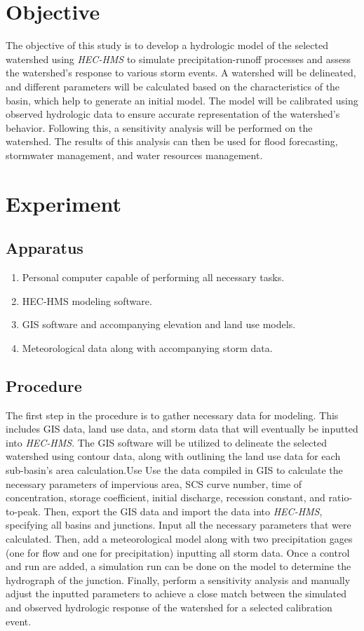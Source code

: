 \documentclass{article}
\begin{document}

\newpage
\doublespacing
\tableofcontents
\newpage
{}
\listoftables
{}
\listoffigures
\newpage
\section{Objective} 
The objective of this study is to develop a hydrologic model of the selected watershed using \emph{HEC-HMS} to simulate precipitation-runoff processes and assess the watershed's response to various storm events. A watershed will be delineated, and different parameters will be calculated based on the characteristics of the basin, which help to generate an initial model. The model will be calibrated using observed hydrologic data to ensure accurate representation of the watershed's behavior. Following this, a sensitivity analysis will be performed on the watershed. The results of this analysis can then be used for flood forecasting, stormwater management, and water resources management.
\newpage
\section{Experiment}
\subsection{Apparatus}
\begin{enumerate}
    \item Personal computer capable of performing all necessary tasks. 
    \item HEC-HMS modeling software. 
    \item GIS software and accompanying elevation and land use models.
    \item Meteorological data along with accompanying storm data.
\end{enumerate}
\subsection{Procedure}
\indent The first step in the procedure is to gather necessary data for modeling. This includes GIS data, land use data, and storm data that will eventually be inputted into \emph{HEC-HMS}. The GIS software will be utilized to delineate the selected watershed using contour data, along with outlining the land use data for each sub-basin's area calculation.Use Use the data compiled in GIS to calculate the necessary parameters of impervious area, SCS curve number, time of concentration, storage coefficient, initial discharge, recession constant, and ratio-to-peak. Then, export the GIS data and import the data into \emph{HEC-HMS}, specifying all basins and junctions. Input all the necessary parameters that were calculated. Then, add a meteorological model along with two precipitation gages (one for flow and one for precipitation) inputting all storm data. Once a control and run are added, a simulation run can be done on the model to determine the hydrograph of the junction. Finally, perform a sensitivity analysis and manually adjust the inputted parameters to achieve a close match between the simulated and observed hydrologic response of the watershed for a selected calibration event.
\newpage
\end{document}
